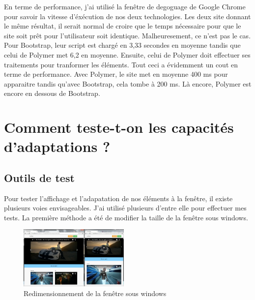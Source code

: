 \documentclass{article}
\begin{document}
En terme de performance, j'ai utilis\'e la fen\^etre de degoguage de Google Chrome pour savoir la vitesse d'\'ex\'ecution de nos deux technologies. Les deux site donnant le m\^eme r\'esultat, il serait normal de croire que le temps n\'ecessaire pour que le site soit pr\^et pour l'utilisateur soit identique. Malheuresement, ce n'est pas le cas. Pour Bootstrap, leur script est charg\'e en 3,33 secondes en moyenne tandis que celui de Polymer met 6,2 en moyenne. Ensuite, celui de Polymer doit effectuer ses traitements pour tranformer les \'el\'ements. Tout ceci a \'evidemment un cout en terme de performance. Avec Polymer, le site met en moyenne 400 ms pour apparaitre tandis qu'avec Bootstrap, cela tombe \`a 200 ms. L\`a encore, Polymer est encore en dessous de Bootstrap.

\newpage
\section{Comment teste-t-on les capacit\'es d'adaptations ?}

\subsection{Outils de test}

\hspace*{0.6cm}Pour tester l'affichage et l'adapatation de nos \'el\'ements \`a la fen\^etre, il existe plusieurs voies envisageables. J'ai utilis\'e plusieurs d'entre elle pour effectuer mes tests. La premi\`ere m\'ethode a \'et\'e de modifier la taille de la fen\^etre sous windows.\\

\begin{figure}
  \vspace{-25pt}
  \begin{center}
    \includegraphics[width=0.48\textwidth]{double}
  \end{center}
  \vspace{-20pt}
  \caption{Redimensionnement de la fen\^etre sous windows}
  \vspace{-10pt}
\end{figure}
\end{document}

